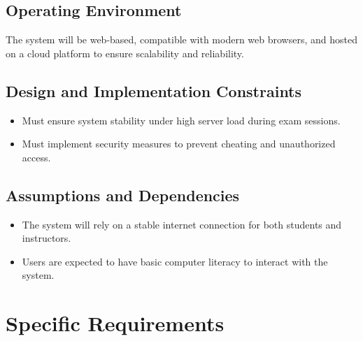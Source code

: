 \documentclass{article}
\begin{document}
	\subsection{Operating Environment}
	The system will be web-based, compatible with modern web browsers, and hosted on a cloud platform to ensure scalability and reliability.
	
	\subsection{Design and Implementation Constraints}
	\begin{itemize}
		\item Must ensure system stability under high server load during exam sessions.
		\item Must implement security measures to prevent cheating and unauthorized access.
	\end{itemize}
	
	\subsection{Assumptions and Dependencies}
	\begin{itemize}
		\item The system will rely on a stable internet connection for both students and instructors.
		\item Users are expected to have basic computer literacy to interact with the system.
	\end{itemize}
	
	\section{Specific Requirements}
	
\end{document}
